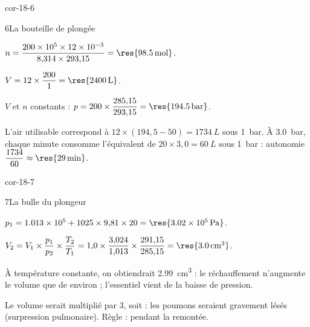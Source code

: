 \begin{blocLivre}{cor-18-6}
\begin{corrige}{6}{La bouteille de plongée}
\begin{questions}
\item $n=\dfrac{200\times10^5\times\num{12e-3}}{8{,}314\times293{,}15}=\res{\qty{98,5}{mol}}$.
\item $V=12\times\dfrac{200}{1}=\res{\qty{2400}{L}}$.
\item $V$ et $n$ constants : $p=200\times\dfrac{285{,}15}{293{,}15}=\res{\qty{194,5}{bar}}$.
\item L'air utilisable correspond à $12\times(194{,}5-50)=\qty{1734}{L}$ sous \qty{1}{bar}. À \qty{3,0}{bar}, chaque minute
consomme l'équivalent de $20\times3{,}0=\qty{60}{L}$ sous \qty{1}{bar} : autonomie $\dfrac{1734}{60}\approx\res{\qty{29}{min}}$.
\end{questions}
\end{corrige}
\end{blocLivre}
\begin{blocLivre}{cor-18-7}
\begin{corrige}{7}{La bulle du plongeur}
\begin{questions}
\item $p_1=\num{1.013e5}+1025\times9{,}81\times20=\res{\qty{3,02e5}{Pa}}$.
\item $V_2=V_1\times\dfrac{p_1}{p_2}\times\dfrac{T_2}{T_1}=1{,}0\times\dfrac{3{,}024}{1{,}013}\times\dfrac{291{,}15}{285{,}15}=\res{\qty{3,0}{cm^3}}$.
\item À température constante, on obtiendrait \qty{2,99}{cm^3} : le réchauffement n'augmente le volume que de
 environ ; l'essentiel vient de la baisse de pression.
\item Le volume serait multiplié par 3, soit  : les poumons seraient gravement lésés (surpression
pulmonaire). Règle :  pendant la remontée.
\end{questions}
\end{corrige}
\end{blocLivre}
